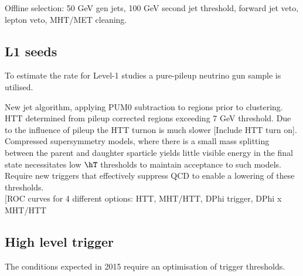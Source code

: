 Offline selection: 50 GeV gen jets, 100 GeV second jet threshold, forward jet veto, lepton veto, MHT/MET cleaning. \\

\subsection{L1 seeds}

To estimate the rate for Level-1 studies a pure-pileup neutrino gun sample is utilised.

New jet algorithm, applying PUM0 subtraction to regions prior to clustering. HTT determined from pileup corrected regions exceeding 7 GeV threshold.
Due to the influence of pileup the HTT turnon is much slower [Include HTT turn on].  Compressed supersymmetry models, where there is a small mass splitting between the parent and daughter sparticle yields little visible energy in the final state necessitates low $\hT$ thresholds to maintain acceptance to such models. Require new triggers that effectively suppress QCD to enable a lowering of these thresholds.\\

{\color{blue} [ROC curves for 4 different options: HTT, MHT/HTT, DPhi trigger, DPhi x MHT/HTT}\\


\subsection{High level trigger}


The conditions expected in 2015 require an optimisation of trigger thresholds.\\



